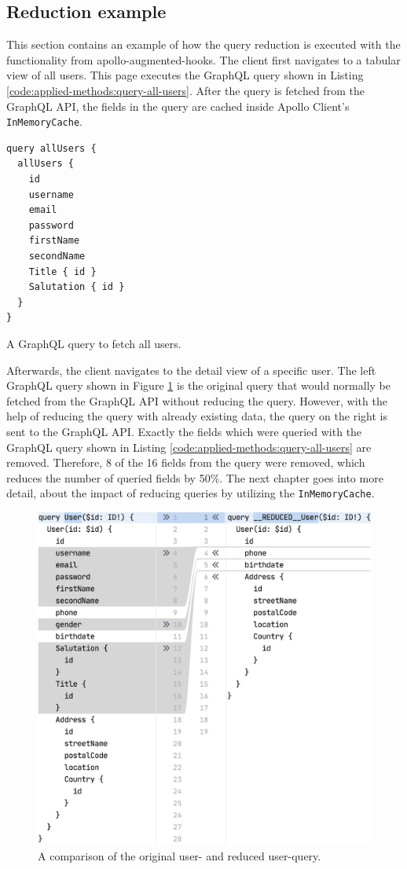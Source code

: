 \subsection{Reduction example}\label{subsection:background:graphql:example-reduction}

This section contains an example of how the query reduction is executed with the functionality from apollo-augmented-hooks. The client first navigates to a tabular view of all users. This page executes the GraphQL query shown in Listing \ref{code:applied-methods:query-all-users}. After the query is fetched from the GraphQL \ac{API}, the fields in the query are cached inside Apollo Client's \texttt{InMemoryCache}.

\ifshowListings
  \begin{listing}[H]
  \begin{verbatim}
query allUsers {
  allUsers {
    id
    username
    email
    password
    firstName
    secondName
    Title { id }
    Salutation { id }
  }
}
  \end{verbatim}
  \caption{A GraphQL query to fetch all users.}\label{code:applied-methods:query-all-users}
  \end{listing}
\fi

\noindent Afterwards, the client navigates to the detail view of a specific user. The left GraphQL query shown in Figure \ref{fig:applied-methods:comparison-user-reduced-user} is the original query that would normally be fetched from the GraphQL \ac{API} without reducing the query. However, with the help of reducing the query with already existing data, the query on the right is sent to the GraphQL \ac{API}. Exactly the fields which were queried with the GraphQL query shown in Listing \ref{code:applied-methods:query-all-users} are removed. Therefore, 8 of the 16 fields from the query were removed, which reduces the number of queried fields by 50\%. The next chapter goes into more detail, about the impact of reducing queries by utilizing the \texttt{InMemoryCache}.

\ifshowImages
  \begin{figure}[H]
  \centering
  \includegraphics[width=0.65\linewidth]{images/reduction-graphql-examples/compare-user-reduced-user.png}
  \caption{A comparison of the original user- and reduced user-query.}\label{fig:applied-methods:comparison-user-reduced-user}
  \end{figure}
\fi
